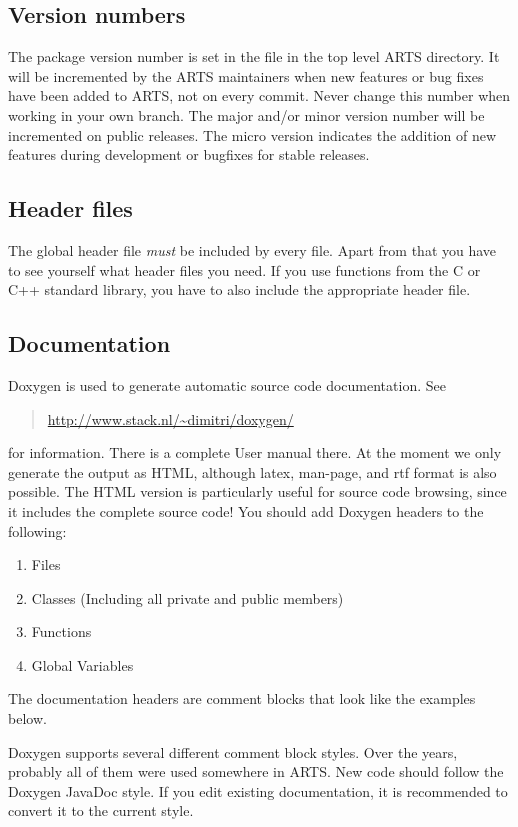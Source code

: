 \subsection{Version numbers} 
The package version number is set in the  file in the top
level ARTS directory. It will be incremented by the ARTS maintainers when new
features or bug fixes have been added to ARTS, not on every commit. Never
change this number when working in your own branch. The major and/or minor
version number will be incremented on public releases. The micro version
indicates the addition of new features during development or bugfixes for
stable releases.

\subsection{Header files} 
The global header file  \emph{must} be included by every
file. Apart from that you have to see yourself what header files you
need. If you use functions from the C or C++ standard library, you
have to also include the appropriate header file.

\subsection{Documentation}
Doxygen is used to generate automatic source code documentation. See
\begin{quote}
  \url{http://www.stack.nl/\~dimitri/doxygen/}
\end{quote}
for information. There is a complete User manual there. At the moment
we only generate the output as HTML, although latex, man-page, and rtf
format is also possible. The HTML version is particularly useful for
source code browsing, since it includes the complete source code! You
should add Doxygen headers to the following:

\begin{enumerate}
\item Files
\item Classes (Including all private and public members)
\item Functions
\item Global Variables
\end{enumerate}

The documentation headers are comment blocks that look like the
examples below.

Doxygen supports several different comment block styles. Over the years,
probably all of them were used somewhere in ARTS. New code should follow the
Doxygen JavaDoc style. If you edit existing documentation, it is recommended
to convert it to the current style.

